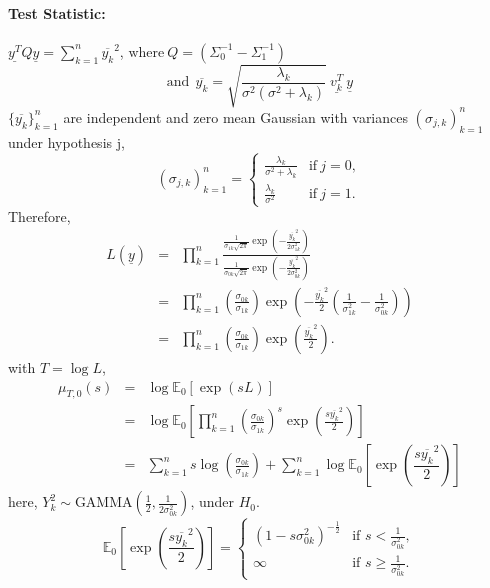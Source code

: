 \documentclass[12pt,a4paper]{article}
\newcommand{\te}{\textrm}
\begin{document}
\paragraph{Test Statistic:} $\underline{y^T}Q\underline{y}=\sum_{k=1}^{n}\overline{y_k}^2$,
 $\te{where}\ Q=(\Sigma_0^{-1}-\Sigma_1^{-1})$
\begin{equation}\te{and} \ \ \overline{y_k}=\sqrt{ \frac{\lambda_k}{\sigma^2(\sigma^2+\lambda_k)}} \:\underline{v_k^T}\:\underline{y}
\end{equation}
$\{\overline{y_k}\}_{k=1}^n$ are independent and zero mean Gaussian with variances $(\sigma_{j,k})_{k=1}^n$ under hypothesis j,
\begin{equation}(\sigma_{j,k})_{k=1}^n=\begin{cases}
\frac{\lambda_k}{\sigma^2+\lambda_k} & \text{if}\ j=0 ,\\
\frac{\lambda_k}{\sigma^2}& \text{if}\ j=1.
\end{cases}
\end{equation}
Therefore,
\begin{eqnarray}
L(\underline{y})&=&\prod_{k=1}^{n}\frac{\frac{1}{\sigma_{1k}\sqrt{2\pi}}\exp\left(-\frac{\overline{y_k}^2}{2\sigma_{1k}^2} \right) }{\frac{1}{\sigma_{0k}\sqrt{2\pi}}\exp\left(-\frac{\overline{y_k}^2}{2\sigma_{0k}^2} \right)}\\
&=&\prod_{k=1}^{n}\left(\frac{\sigma_{0k}}{\sigma_{1k}} \right) \exp\left(-\frac{\overline{y_k}^2}{2}\left(\frac{1}{\sigma_{1k}^2}-\frac{1}{\sigma_{0k}^2} \right)  \right)\\
&=&\prod_{k=1}^{n}\left(\frac{\sigma_{0k}}{\sigma_{1k}} \right) \exp\left(\frac{\overline{y_k}^2}{2}\right).
\end{eqnarray}
with $T=\log{L}$,
\begin{eqnarray}
\mu_{T,0}(s)&=&\log{\mathbb{E}_0\left[\exp(sL)\right]}\\
&=&\log{\mathbb{E}_0\left[\prod_{k=1}^{n}\left(\frac{\sigma_{0k}}{\sigma_{1k}} \right)^{s} \exp\left(\frac{s\overline{y_k}^2}{2}\right)\right]}\\
&=&\sum_{k=1}^{n}s\log\left(\frac{\sigma_{0k}}{\sigma_{1k}} \right) + \sum_{k=1}^{n}\log{\mathbb{E}_0\left[\exp\left( \dfrac{s\overline{y_k}^2}{2}\right) \right]}
\end{eqnarray}
here, $ Y_k^2 \sim \text{GAMMA}\left(\frac{1}{2},\frac{1}{2\sigma_{0k}^2} \right) $, under $ H_0 $.
\begin{equation}
\mathbb{E}_0\left[\exp\left( \dfrac{s\overline{y_k}^2}{2}\right) \right]=\begin{cases}
\left( 1-s\sigma_{0k}^2\right)^{-\frac{1}{2}} & \text{if $s<\frac{1}{\sigma_{0k}^2}$} ,\\
\infty& \text{if $s\geq\frac{1}{\sigma_{0k}^2}$}.
\end{cases}
\end{equation}
\end{document}
